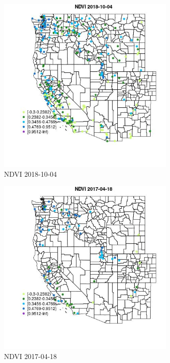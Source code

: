 \begin{figure} 
\centering  
\includegraphics[width=0.77\textwidth]{Code_Outputs/Report_ML_input_PM25_Step4_part_f_de_duplicated_aveswNAs_MapObsNDVI2018-10-04.jpg} 
\caption{\label{fig:Report_ML_input_PM25_Step4_part_f_de_duplicated_aveswNAsMapObsNDVI2018-10-04}NDVI 2018-10-04} 
\end{figure} 
 

\begin{figure} 
\centering  
\includegraphics[width=0.77\textwidth]{Code_Outputs/Report_ML_input_PM25_Step4_part_f_de_duplicated_aveswNAs_MapObsNDVI2017-04-18.jpg} 
\caption{\label{fig:Report_ML_input_PM25_Step4_part_f_de_duplicated_aveswNAsMapObsNDVI2017-04-18}NDVI 2017-04-18} 
\end{figure} 
 

